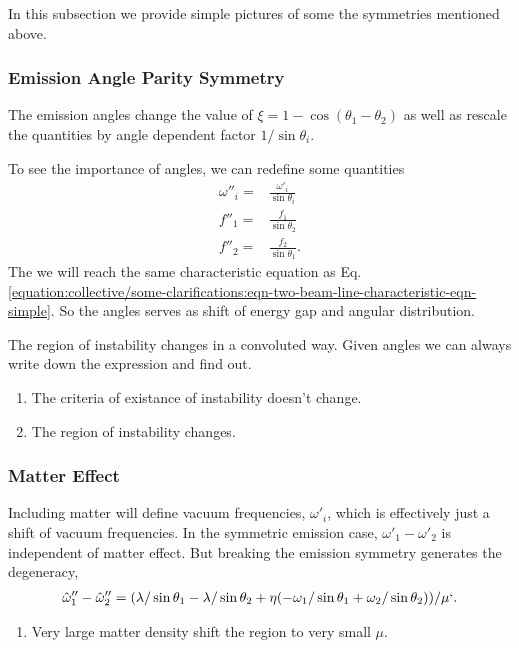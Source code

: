 \documentclass[letterpaper,12pt,english]{sphinxmanual}
\begin{document}
In this subsection we provide simple pictures of some the symmetries mentioned above.


\subsubsection{Emission Angle Parity Symmetry}
\label{\detokenize{collective/some-clarifications:emission-angle-parity-symmetry}}
The emission angles change the value of \(\xi=1-\cos(\theta_1-\theta_2)\) as well as rescale the quantities by angle dependent factor \(1/\sin\theta_i\).

To see the importance of angles, we can redefine some quantities
\begin{equation*}
\begin{split}\omega''_i=& \frac{\omega'_i}{\sin\theta_i}\\
f''_1=&\frac{f_1}{\sin\theta_2} \\
f''_2=&\frac{f_2}{\sin\theta_1}.\end{split}
\end{equation*}
The we will reach the same characteristic equation as Eq. \eqref{equation:collective/some-clarifications:eqn-two-beam-line-characteristic-eqn-simple}. So the angles serves as shift of energy gap and angular distribution.

The region of instability changes in a convoluted way. Given angles we can always write down the expression and find out.
\begin{enumerate}
\item {} 
The criteria of existance of instability doesn't change.

\item {} 
The region of instability changes.

\end{enumerate}


\subsubsection{Matter Effect}
\label{\detokenize{collective/some-clarifications:matter-effect}}
Including matter will define vacuum frequencies, \(\omega'_i\), which is effectively just a shift of vacuum frequencies. In the symmetric emission case, \(\omega'_1-\omega'_2\) is independent of matter effect. But breaking the emission symmetry generates the degeneracy,
\begin{equation*}
\begin{split}\hat\omega''_1-\hat\omega''_2=( \lambda/\sin\theta_1 - \lambda/\sin\theta_2 + \eta(- \omega_1/\sin\theta_1 + \omega_2/\sin\theta_2) )/\mu`.\end{split}
\end{equation*}\begin{enumerate}
\item {} 
Very large matter density shift the region to very small \(\mu\).

\end{enumerate}
\end{document}
